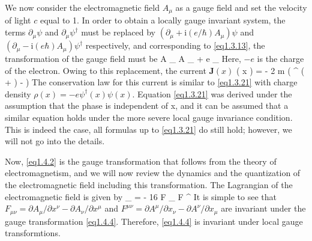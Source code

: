 We now consider the electromagnetic field $A_\mu$ as a gauge field and set the velocity of light $c$ equal to 1. In order to obtain a locally gauge invariant system, the terms $\partial _ { \mu } \psi$ and $\partial _ { \mu } \psi ^ { \dagger }$ must be replaced by $\left( \partial _ { \mu } + \mathrm { i } ( e / \hbar ) A _ { \mu } \right) \psi$ and $\left( \partial _ { \mu } - \mathrm { i } ( e \hbar ) A _ { \mu } \right) \psi ^ { \dagger }$ respectively, and corresponding to \eqref{eq1.3.13}, the transformation of the gauge field must be 
\be\label{eq1.4.2}
A _ { \mu } \rightarrow A _ { \mu } + \frac { \hbar } { e } \partial _ { \mu } \alpha
\ee
Here, $- e$ is the charge of the electron. Owing to this replacement, the current $\boldsymbol { J } ( x )$ 
\be\label{eq1.4.3}
 ( x ) = -  { 2 m  } \left( \psi ^ { \dagger } \left( \nabla +  { \hbar }  \right) \psi -  \psi \right)
\ee
The conservation law for this current is similar to \eqref{eq1.3.21} with charge density $\rho ( x ) = - e \psi ^ { \dagger } ( x ) \psi ( x )$. Equation \eqref{eq1.3.21} was derived under the assumption that the phase is independent of x, and it can be assumed that a similar equation holds under the more severe local gauge invariance condition. This is indeed the case, all formulas up to \eqref{eq1.3.21} do still hold; however, we will not go into the details.

Now, \eqref{eq1.4.2} is the gauge transformation that follows from the theory of electromagnetism, and we will now review the dynamics and the quantization of the electromagnetic field including this transformation. The Lagrangian of the electromagnetic field is given by
\be\label{eq1.4.4}
 _ {  } = -  { 16 \pi } F _ { \mu \nu } F ^ { \mu \nu }
\ee
It is simple to see that $F _ { \mu \nu } = \partial A _ { \mu } / \partial x ^ { \nu } - \partial A _ { \nu } / \partial x ^ { \mu }$ and $F ^ { \mu \nu } = \partial A ^ { \mu } / \partial x _ { \nu } - \partial A ^ { \nu } / \partial x _ { \mu }$ are invariant under the gauge transformation \eqref{eq1.4.4}. Therefore, \eqref{eq1.4.4} is invariant under local gauge transformtions.

